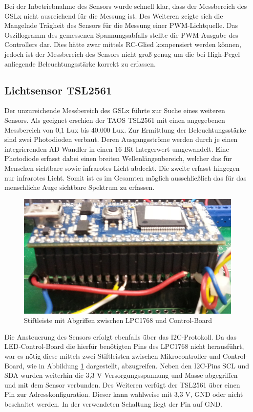 \documentclass[a4paper,12pt]{scrartcl}
\begin{document}
Bei der Inbetriebnahme des Sensors wurde schnell klar, dass der Messbereich des GSLx nicht ausreichend für die Messung ist. Des Weiteren zeigte sich die Mangelnde Trägheit des Sensors für die Messung einer PWM-Lichtquelle. Das Oszillogramm des gemessenen Spannungsabfalls stellte die PWM-Ausgabe des Controllers dar. Dies hätte zwar mittels RC-Glied kompensiert werden können, jedoch ist der Messbereich des Sensors nicht groß genug um die bei High-Pegel anliegende Beleuchtungsstärke korrekt zu erfassen.

\subsection{Lichtsensor TSL2561}

Der unzureichende Messbereich des GSLx führte zur Suche eines weiteren Sensors. Als geeignet erschien der TAOS TSL2561 mit einen angegebenen Messbereich von 0,1 Lux bis 40.000 Lux. Zur Ermittlung der Beleuchtungsstärke sind zwei Photodioden verbaut. Deren Ausgangsströme werden durch je einen integrierenden AD-Wandler in einen 16 Bit Integerwert umgewandelt. Eine Photodiode erfasst dabei einen breiten Wellenlängenbereich, welcher das für Menschen sichtbare sowie infrarotes Licht abdeckt. Die zweite erfasst hingegen nur infrarotes Licht. Somit ist es im Gesamten möglich ausschließlich das für das menschliche Auge sichtbare Spektrum zu erfassen.

\begin{figure}[H]
\begin{center}
\includegraphics[width=0.5\hsize]{./images/stiftleiste.png}
\end{center}
\caption{\label{fig:stiftleiste}Stiftleiste mit Abgriffen zwischen LPC1768 und Control-Board}
\end{figure}

Die Ansteuerung des Sensors erfolgt ebenfalls über das I2C-Protokoll. Da das LED-Control-Board die hierfür benötigten Pins des LPC1768 nicht herausführt, war es nötig diese mittels zwei Stiftleisten zwischen Mikrocontroller und Control-Board, wie in Abbildung \ref{fig:stiftleiste} dargestellt, abzugreifen. Neben den I2C-Pins SCL und SDA wurden weiterhin die 3,3 V Versorgungsspannung und Masse abgegriffen und mit dem Sensor verbunden. Des Weiteren verfügt der TSL2561 über einen Pin zur Adresskonfiguration. Dieser kann wahlweise mit 3,3 V, GND oder nicht beschaltet werden. In der verwendeten Schaltung liegt der Pin auf GND.
\end{document}
